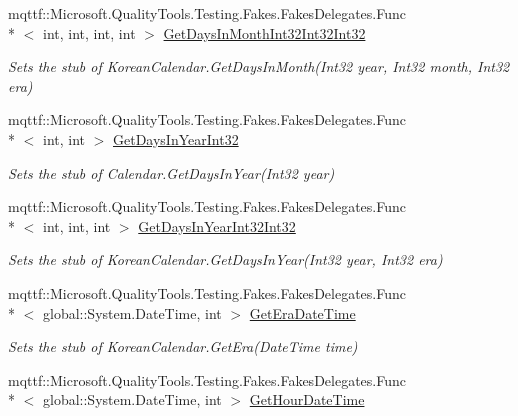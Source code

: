 \begin{DoxyCompactItemize}
mqttf\-::\-Microsoft.\-Quality\-Tools.\-Testing.\-Fakes.\-Fakes\-Delegates.\-Func\\*
$<$ int, int, int, int $>$ \hyperlink{class_system_1_1_globalization_1_1_fakes_1_1_stub_korean_calendar_aa2dacede3a246adb39caf737f9b52b55}{Get\-Days\-In\-Month\-Int32\-Int32\-Int32}
\begin{DoxyCompactList}\small\item\em Sets the stub of Korean\-Calendar.\-Get\-Days\-In\-Month(\-Int32 year, Int32 month, Int32 era)\end{DoxyCompactList}\item 
mqttf\-::\-Microsoft.\-Quality\-Tools.\-Testing.\-Fakes.\-Fakes\-Delegates.\-Func\\*
$<$ int, int $>$ \hyperlink{class_system_1_1_globalization_1_1_fakes_1_1_stub_korean_calendar_a8b279b3b70fcac0b4feba841579569f9}{Get\-Days\-In\-Year\-Int32}
\begin{DoxyCompactList}\small\item\em Sets the stub of Calendar.\-Get\-Days\-In\-Year(\-Int32 year)\end{DoxyCompactList}\item 
mqttf\-::\-Microsoft.\-Quality\-Tools.\-Testing.\-Fakes.\-Fakes\-Delegates.\-Func\\*
$<$ int, int, int $>$ \hyperlink{class_system_1_1_globalization_1_1_fakes_1_1_stub_korean_calendar_a89620a321b9183257ca250badd664921}{Get\-Days\-In\-Year\-Int32\-Int32}
\begin{DoxyCompactList}\small\item\em Sets the stub of Korean\-Calendar.\-Get\-Days\-In\-Year(\-Int32 year, Int32 era)\end{DoxyCompactList}\item 
mqttf\-::\-Microsoft.\-Quality\-Tools.\-Testing.\-Fakes.\-Fakes\-Delegates.\-Func\\*
$<$ global\-::\-System.\-Date\-Time, int $>$ \hyperlink{class_system_1_1_globalization_1_1_fakes_1_1_stub_korean_calendar_aa7e16b5aaf037485721c8388d5e67982}{Get\-Era\-Date\-Time}
\begin{DoxyCompactList}\small\item\em Sets the stub of Korean\-Calendar.\-Get\-Era(\-Date\-Time time)\end{DoxyCompactList}\item 
mqttf\-::\-Microsoft.\-Quality\-Tools.\-Testing.\-Fakes.\-Fakes\-Delegates.\-Func\\*
$<$ global\-::\-System.\-Date\-Time, int $>$ \hyperlink{class_system_1_1_globalization_1_1_fakes_1_1_stub_korean_calendar_a9693635709b7bee1310fc24f4dbdf76c}{Get\-Hour\-Date\-Time}

\end{DoxyCompactItemize}
